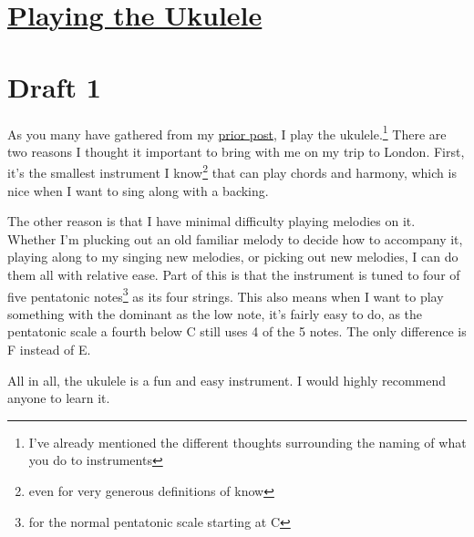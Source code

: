 \documentclass[12pt]{article}[titlepage]
\newcommand{\1}{\={a}}
\newcommand{\2}{\={e}}
\newcommand{\3}{\={\i}}
\newcommand{\4}{\=o}
\newcommand{\5}{\=u}
\newcommand{\6}{\={A}}
\renewcommand{\,}{\textsuperscript{,}}
\begin{document}
\doublespacing
\section{\href{playing-the-ukulele.html}{Playing the Ukulele}}
\section{Draft 1}
As you many have gathered from my \href{http://j.rebelsky.com/pierogi-recipe.html}{prior post}, I play the ukulele.\footnote{I’ve already mentioned the different thoughts surrounding the naming of what you do to instruments}
There are two reasons I thought it important to bring with me on my trip to London.
First, it’s the smallest instrument I know\footnote{even for very generous definitions of know} that can play chords and harmony, which is nice when I want to sing along with a backing.

The other reason is that I have minimal difficulty playing melodies on it.
Whether I’m plucking out an old familiar melody to decide how to accompany it, playing along to my singing new melodies, or picking out new melodies, I can do them all with relative ease.
Part of this is that the instrument is tuned to four of five pentatonic notes\footnote{for the normal pentatonic scale starting at C} as its four strings.
This also means when I want to play something with the dominant as the low note, it’s fairly easy to do, as the pentatonic scale a fourth below C still uses 4 of the 5 notes.
The only difference is F instead of E.

All in all, the ukulele is a fun and easy instrument.
I would highly recommend anyone to learn it.
\end{document}
